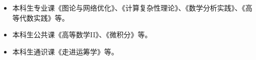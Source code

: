 %
%


\begin{itemize}[leftmargin=*]
	\item 本科生专业课《图论与网络优化》、《计算复杂性理论》、《数学分析实践》、《高等代数实践》等。
	\item 本科生公共课《高等数学II》、《微积分》等。
	\item 本科生通识课《走进运筹学》等。
\end{itemize}